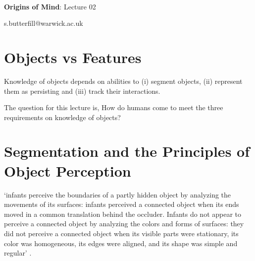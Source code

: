 \documentclass[12pt]{extarticle}
\date{}
\makeatletter
\def \ititle {Origins of Mind}
\def \isubtitle {Lecture 02}
\def \iemail{s.butterfill@warwick.ac.uk}
\makeatother
\begin{document}
\begin{multicols}{3}

\setlength\footnotesep{1em}











\def \ititle {Origins of Mind}
 
\def \isubtitle {Lecture 02}
 
 
 
\
 
 
 
\begin{center}
 
{\Large
 
\textbf{\ititle}: \isubtitle
 
}
 
 
 
\iemail %
 
\end{center}
 
 
 
\section{Objects vs Features}
 
Knowledge of objects depends on abilities to (i) segment objects, (ii) represent them as persisting and (iii) track their interactions.
 
The question for this lecture is, How do humans come to meet the three requirements on knowledge of objects?
 
 
 
\section{Segmentation and the Principles of Object Perception}
 
`infants perceive the boundaries of a partly hidden object by analyzing the movements of its surfaces: infants perceived a connected object when its ends moved in a common translation behind the occluder. Infants do not appear to perceive a connected object by analyzing the colors and forms of surfaces: they did not perceive a connected object when its visible parts were stationary, its color was homogeneous, its edges were aligned, and its shape was simple and regular' \citep{kellman:1983_perception}.
 

\end{multicols}
\end{document}

